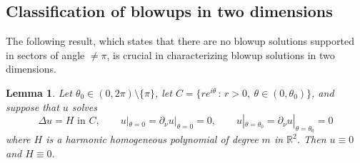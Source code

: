 \documentclass[11pt,a4paper]{amsart}
\newtheorem{Lemma}[Theorem]{Lemma}
\theoremstyle{definition}
\numberwithin{equation}{section}
\newcommand{\mR}{\mathbb{R}}                    %
\newcommand{\p}{\partial}
\begin{document}


\subsection{Classification of blowups in two dimensions}

The following result, which states that there are no blowup solutions supported in sectors of angle $\neq \pi$, is crucial in characterizing blowup solutions in two dimensions.

\begin{Lemma} \label{lemma_twodim_sector}
Let $\theta_0 \in (0,2\pi) \setminus \{ \pi \}$, let $C = \{ r e^{i\theta} \,:\, r > 0, \ \theta \in (0,\theta_0) \}$, and suppose that $u$ solves 
\[
\Delta u = H \text{ in $C$}, \qquad u|_{\theta=0} = \p_{\nu} u|_{\theta=0} = 0, \qquad u|_{\theta=\theta_0} = \p_{\nu} u|_{\theta=\theta_0} = 0
\]
where $H$ is a harmonic homogeneous polynomial of degree $m$ in $\mR^2$. Then $u \equiv 0$ and $H \equiv 0$.
\end{Lemma}
\end{document}
